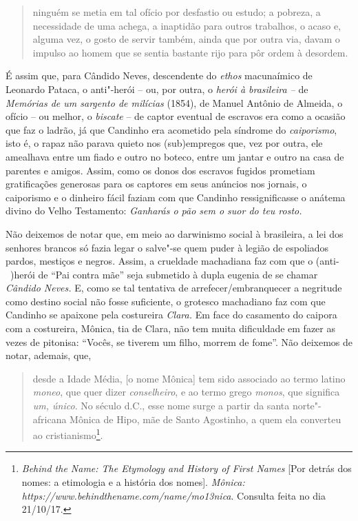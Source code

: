 \begin{quote}
ninguém se metia em tal ofício por desfastio ou estudo; a pobreza, a
necessidade de uma achega, a inaptidão para outros trabalhos, o acaso e,
alguma vez, o gosto de servir também, ainda que por outra via, davam o
impulso ao homem que se sentia bastante rijo para pôr ordem à desordem.
\end{quote}

É assim que, para Cândido Neves, descendente do \emph{ethos} macunaímico
de Leonardo Pataca, o anti"-herói -- ou, por outra, o \emph{herói à
brasileira --} de \emph{Memórias de um sargento de milícias} (1854), de
Manuel Antônio de Almeida, o ofício -- ou melhor, o \emph{biscate} -- de
captor eventual de escravos era como a ocasião que faz o ladrão, já que
Candinho era acometido pela síndrome do \emph{caiporismo}, isto é, o
rapaz não parava quieto nos (sub)empregos que, vez por outra, ele
amealhava entre um fiado e outro no boteco, entre um jantar e outro na
casa de parentes e amigos. Assim, como os donos dos escravos fugidos
prometiam gratificações generosas para os captores em seus anúncios nos
jornais, o caiporismo e o dinheiro fácil faziam com que Candinho
ressignificasse o anátema divino do Velho Testamento: \emph{Ganharás o
pão sem o suor do teu rosto. }

Não deixemos de notar que, em meio ao darwinismo social à brasileira, a
lei dos senhores brancos só fazia legar o salve"-se quem puder à legião
de espoliados pardos, mestiços e negros. Assim, a crueldade machadiana
faz com que o (anti-~)herói de ``Pai contra mãe'' seja submetido à dupla
eugenia de se chamar \emph{Cândido Neves.} E, como se tal tentativa de
arrefecer/embranquecer a negritude como destino social não fosse
suficiente, o grotesco machadiano faz com que Candinho se apaixone pela
costureira \emph{Clara.} Em face do casamento do caipora com a
costureira, Mônica, tia de Clara, não tem muita dificuldade em fazer as
vezes de pitonisa: ``Vocês, se tiverem um filho, morrem de fome''. Não
deixemos de notar, ademais, que,

\begin{quote}
desde a Idade Média, [o nome Mônica] tem sido associado ao termo
latino \emph{moneo}, que quer dizer \emph{conselheiro}, e ao termo grego
\emph{monos}, que significa \emph{um, único}. No século  d.C., esse
nome surge a partir da santa norte"-africana Mônica de Hipo, mãe de Santo
Agostinho, a quem ela converteu ao cristianismo\footnote{\emph{Behind
  the Name: The Etymology and History of First Names} [Por detrás dos
  nomes: a etimologia e a história dos nomes]. \emph{Mônica: https://www.behindthename.com/name/mo13nica}.
  Consulta feita no dia 21/10/17.}.
\end{quote}

